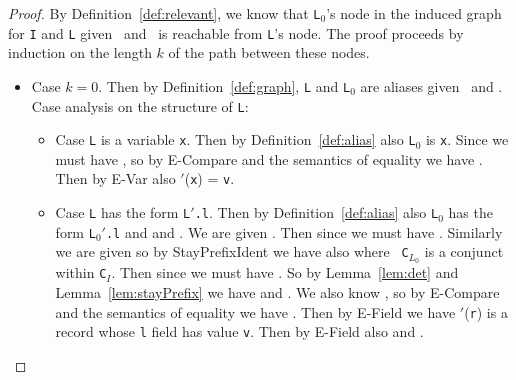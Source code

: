 \begin{proof}

By Definition~\ref{def:relevant}, we know that {\tt L$_0$}'s node in the induced
graph for {\tt I} and {\tt L} given \Euid\ and \Huid\ is reachable
from {\tt L}'s node.  The proof proceeds by
induction on the length $k$ of the path between these nodes.
\begin{itemize}
\item Case $k=0$.  Then by Definition~\ref{def:graph}, {\tt L} and {\tt L$_0$}
  are aliases given \Euid\ and \Huid.  Case analysis on the structure
  of {\tt L}:
  \begin{itemize}
  \item Case {\tt L} is a variable {\tt x}.  Then by
  Definition~\ref{def:alias} also
 {\tt L$_0$} is {\tt x}.  Since
 we must have , so by {\sc
   E-Compare} and the semantics of equality we have
 .  Then by
 {\sc E-Var} also \Euid$'$({\tt x}) =
  {\tt v}.

  \item Case {\tt L} has the form {\tt L$'$.l}.  Then by
    Definition~\ref{def:alias} also {\tt L$_0$} has the
    form {\tt L$_0'$.l} and 
    and .  
We are given 
. Then since 
 we must have .
Similarly we are given 
 so by {\sc StayPrefixIdent} we
have also  where {\tt
  C$_{L_0}$} is a conjunct within {\tt C$_I$}.  Then since 
 we must have .  So by
Lemma~\ref{lem:det} and Lemma~\ref{lem:stayPrefix} we have 
 and
.  
 We also know , so by {\sc
   E-Compare} and the semantics of equality we have
 .  Then by
 {\sc E-Field} we have \Huid$'$({\tt r}) is a record whose {\tt l}
 field has value {\tt v}.  Then by {\sc E-Field} also 
and .

  \end{itemize}


\end{itemize}
\end{proof}
